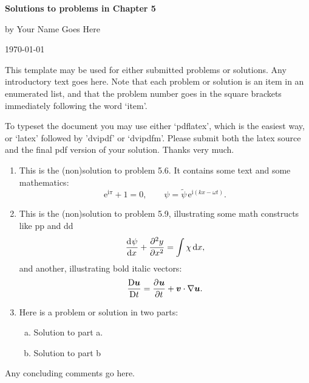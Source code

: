 \documentclass[11pt]{article}
\newcommand{\ir}{\mathrm{i}}
\newcommand{\dr}{\mathrm{d}}
\newcommand{\D}{\mathrm{D}}
\newcommand{\e}{\, \mathrm{e}} \newcommand{\er}{\mathrm{e}}
\newcommand{\vb}{\bm {v}\xspace}
\newcommand{\ub}{\bm {u}\xspace}
\newcommand{\dd}[3][]{{\dr^{#1} #2 \over \dr #3^{#1}}}
\newcommand{\pp}[3][]{{\partial^{#1} #2 \over \partial #3^{#1}}}
\newcommand{\DD}[1]{{\D#1 \over \D t}}
\begin{document}
\centerline{\textbf{\textsf{\Large Solutions to problems in Chapter 5}}}
\medskip
\centerline{\textsf{\large by Your Name Goes Here} }
\medskip
\centerline{\today}

\vskip 1cm

This template may be used for either submitted problems or solutions. 
Any introductory text goes here. Note that each problem or solution is an
item in an enumerated list, and that the problem number goes in the square
brackets immediately following the word `item'. 

To typeset the document you may use either `pdflatex', which is the easiest
way, or `latex' followed by 'dvipdf' or `dvipdfm'. Please submit both the
latex source and the final pdf version of your solution. Thanks very much.

\begin{enumerate}
  
\item [5.6]  This is the (non)solution to problem 5.6. It contains some
text and some mathematics:
\begin{equation}
  \er^{\ir \pi} + 1 = 0, \qquad \psi = \widetilde{\psi} \e^{\ir(k x - \omega t)} .
\end{equation}


\item [5.9]  This is the (non)solution to problem 5.9, illustrating some
math constructs like pp and dd
\begin{equation}
 \dd \psi x + \pp[2]y x  = \int \chi \, \dr x ,
\end{equation}
and another, illustrating bold italic vectors:
\begin{equation}
 \DD \ub = \pp \ub t + \vb \cdot \nabla \ub .
\end{equation}

\item [5.10] Here is a problem or solution in two parts:
    \begin{enumerate}[(a)]
       \item Solution to part a. 
   
       \item Solution to part b
  \end{enumerate}


\end{enumerate}

Any concluding comments go here. 
\end{document}
